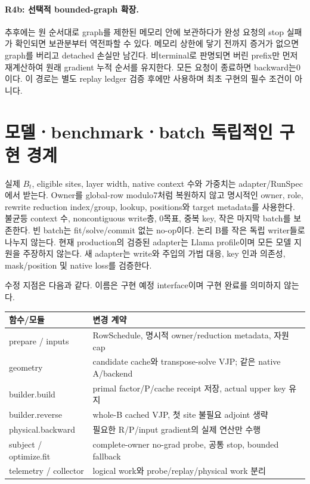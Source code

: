 \documentclass[11pt]{article}
\begin{document}
\paragraph{R4b: 선택적 bounded-graph 확장.}
추후에는 원 순서대로 graph를 제한된 메모리 안에 보관하다가 완성 요청의 stop 실패가
확인되면 보관분부터 역전파할 수 있다. 메모리 상한에 닿기 전까지 증거가 없으면 graph를
버리고 detached 손실만 남긴다. 비terminal로 판명되면 버린 prefix만 먼저 재계산하여
원래 gradient 누적 순서를 유지한다. 모든 요청이 종료하면 backward는0이다.
이 경로는 별도 replay ledger 검증 후에만 사용하며 최초 구현의 필수 조건이 아니다.

\section{모델ㆍbenchmarkㆍbatch 독립적인 구현 경계}
실제 $B_t$, eligible sites, layer width, native context 수와 가중치는 adapter/RunSpec에서
받는다. Owner를 global-row modulo7처럼 복원하지 않고 명시적인 owner, role, rewrite
reduction index/group, lookup, positions와 target metadata를 사용한다.
불균등 context 수, noncontiguous write층, 0목표, 중복 key, 작은 마지막 batch를 보존한다.
빈 batch는 fit/solve/commit 없는 no-op이다. 논리 B를 작은 독립 writer들로 나누지 않는다.
현재 production의 검증된 adapter는 Llama profile이며 모든 모델 지원을 주장하지 않는다.
새 adapter는 write와 주입의 가법 대응, key 인과 의존성, mask/position 및 native loss를 검증한다.

수정 지점은 다음과 같다. 이름은 구현 예정 interface이며 구현 완료를 의미하지 않는다.
\begin{center}\small
\begin{tabular}{p{.27\linewidth}p{.64\linewidth}}
\toprule
함수/모듈 & 변경 계약\\\midrule
prepare / inputs & RowSchedule, 명시적 owner/reduction metadata, 자원 cap\\
geometry & candidate cache와 transpose-solve VJP; 같은 native A/backend\\
builder.build & primal factor/P/cache receipt 저장, actual upper key 유지\\
builder.reverse & whole-B cached VJP, 첫 site 불필요 adjoint 생략\\
physical.backward & 필요한 R/P/input gradient의 실제 연산만 수행\\
subject / optimize.fit & complete-owner no-grad probe, 공통 stop, bounded fallback\\
telemetry / collector & logical work와 probe/replay/physical work 분리\\\bottomrule
\end{tabular}\end{center}
\end{document}
